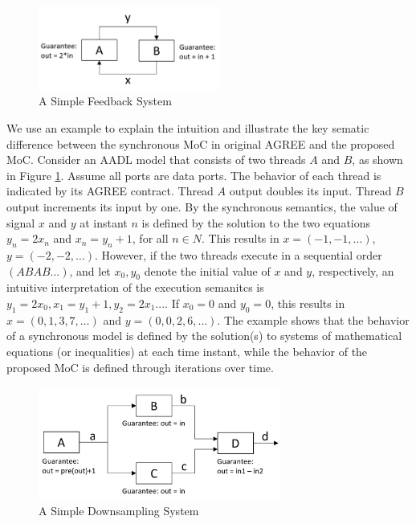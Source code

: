 \begin{figure}[ht!]
\centering
\includegraphics[width=60mm]{simpleFeedback.jpg}
\caption{A Simple Feedback System\label{motivationFig1}}
\end{figure}

We use an example to explain the intuition and illustrate the key sematic difference between the synchronous MoC in original AGREE and the proposed MoC.
Consider an AADL model that consists of two threads $A$ and $B$, as shown in Figure \ref{motivationFig1}. Assume all ports are data ports. The behavior of each thread is indicated by its AGREE contract. Thread $A$ output doubles its input. Thread $B$ output increments its input by one. By the synchronous semantics, the value of signal $x$ and $y$ at instant $n$ is defined by the solution to the two equations $y_n = 2x_n$ and $x_n = y_n+1$, for all $n \in N$. This results in $x = (-1, -1, …)$, $y = (-2, -2, …)$. However, if the two threads execute in a sequential order $(ABAB...)$, and let $x_0, y_0$ denote the initial value of $x$ and $y$, respectively, an intuitive interpretation of the execution semanitcs is $y_1 = 2x_0, x_1 = y_1+1, y_2 = 2x_1...$. If $x_0 = 0$ and  $y_0 = 0$, this results in $x = (0, 1, 3, 7,…)$ and $y = (0, 0, 2, 6, …)$. The example shows that the behavior of a synchronous model is defined by the solution(s) to systems of mathematical equations (or inequalities) at each time instant, while the behavior of the proposed MoC is defined through iterations over time. 

\begin{figure}[ht!]
\centering
\includegraphics[width=80mm]{downsample.jpg}
\caption{A Simple Downsampling System\label{motivationFig2}}
\end{figure}

